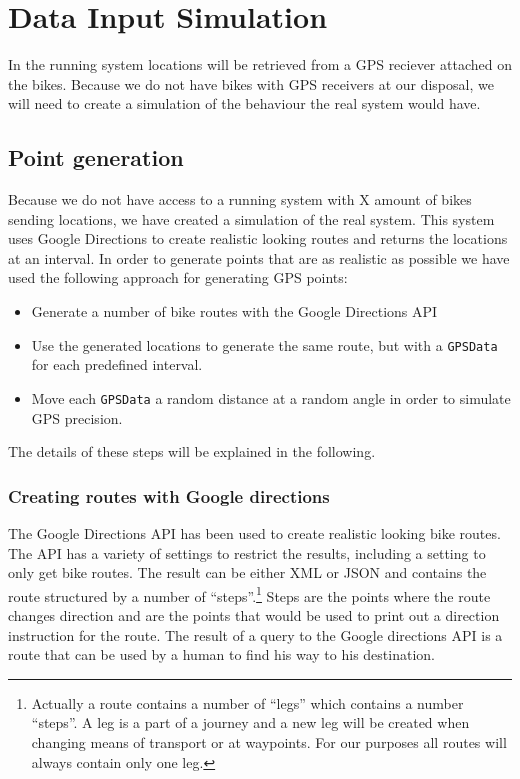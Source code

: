 \section{Data Input Simulation}\label{design:datasimulation}
In the running system locations will be retrieved from a GPS reciever attached on the bikes.
Because we do not have bikes with GPS receivers at our disposal, we will need to create a simulation of the behaviour the real system would have.

\subsection{Point generation}
Because we do not have access to a running system with X amount of bikes sending locations, we have created a simulation of the real system.
This system uses Google Directions to create realistic looking routes and returns the locations at an interval.
In order to generate points that are as realistic as possible we have used the following approach for generating GPS points:

\begin{itemize}
\item Generate a number of bike routes with the Google Directions API
\item Use the generated locations to generate the same route, but with a \texttt{GPSData} for each predefined interval.
\item Move each \texttt{GPSData} a random distance at a random angle in order to simulate GPS precision.
\end{itemize}

The details of these steps will be explained in the following.

\subsubsection{Creating routes with Google directions}
The Google Directions API \cite{gdirections} has been used to create realistic looking bike routes.
The API has a variety of settings to restrict the results, including a setting to only get bike routes.
The result can be either XML or JSON and contains the route structured by a number of ``steps''.\footnote{Actually a route contains a number of  ``legs'' which contains a number ``steps''. 
A leg is a part of a journey and a new leg will be created when changing means of transport or at waypoints.
For our purposes all routes will always contain only one leg.}
Steps are the points where the route changes direction and are the points that would be used to print out a direction instruction for the route.
The result of a query to the Google directions API is a route that can be used by a human to find his way to his destination.

